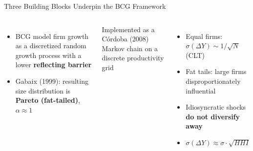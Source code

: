 \documentclass[10pt,aspectratio=169]{beamer}
\begin{document}
\begin{frame}{Three Building Blocks Underpin the BCG Framework}

\vspace{0.1em}
\begin{columns}[T]


\vspace{0.2em}
\begin{itemize}\footnotesize
  \item BCG model firm growth as a discretized random growth process with a lower \textbf{reflecting barrier}
  \vspace{0.2em}
  \item[\color{accentgreen}$\Rightarrow$] Gabaix (1999): resulting size distribution is \textbf{Pareto (fat-tailed)}, $\alpha \approx 1$
\end{itemize}

\vspace{0.5em}
{\scriptsize\color{midgray} Implemented as a C\'{o}rdoba (2008) Markov chain on a discrete productivity grid\par}


\vspace{0.2em}
\begin{itemize}\footnotesize
  \item Equal firms: $\sigma(\Delta Y) \sim 1/\sqrt{N}$ (CLT)
  \item Fat tails: large firms disproportionately influential
  \item Idiosyncratic shocks \textbf{do not diversify away}
  \vspace{0.2em}
  \item[\color{accentgreen}$\Rightarrow$] $\sigma(\Delta Y) \approx \sigma\cdot\sqrt{HHI}$
\end{itemize}


\end{columns}
\end{frame}
\end{document}
